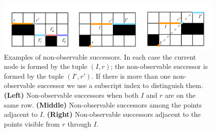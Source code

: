 \begin{figure}[tb]
\center
		   \includegraphics[width=\columnwidth]
			{images/non_observable.pdf}
	\vspace{-3pt}
\caption{\small
Examples of non-observable successors. In each case the current node
is formed by the tuple $(I, r)$; the non-observable successor 
is formed by the tuple $(I', r')$. If there is more than one 
non-observable successor we use a subscript index to distinguish them.
\textbf{(Left)} Non-observable successors when both $I$ and $r$ are on
the same row. \textbf{(Middle)} Non-observable successors among the 
points adjacent to $I$. \textbf{(Right)} Non-observable successors
adjacent to the points visible from $r$ through $I$.
}
\label{fig::non-observable}
\end{figure}
